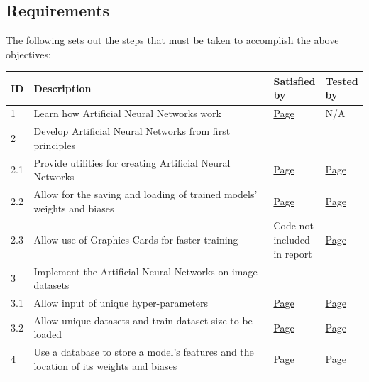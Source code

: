 \documentclass[./project-report/src/latex/project-report.tex]{subfiles}
\begin{document}
\subsection{Requirements}

The following sets out the steps that must be taken to accomplish the above objectives:

\noindent\begin{tabular}{|p{0.03\linewidth}|p{0.73\linewidth}|p{0.12\linewidth}|p{0.12\linewidth}|}
      \hline
      \textbf{ID} & \textbf{Description} & \textbf{Satisfied by} & \textbf{Tested by} \\
      \hline
      1 & Learn how Artificial Neural Networks work & \hyperref[sec:ann-theory]{Page \pageref{sec:ann-theory}} & N/A \\
      \hline
      2 & Develop Artificial Neural Networks from first principles & & \\
      \hline
      2.1 & Provide utilities for creating Artificial Neural Networks & \hyperref[sec:utils-subpackage]{Page \pageref{sec:utils-subpackage}} & \hyperref[sec:models-utils-unit-tests]{Page \pageref{sec:models-utils-unit-tests}} \\
      \hline
      2.2 & Allow for the saving and loading of trained models' weights and biases & \hyperref[sec:model-module]{Page \pageref{sec:model-module}} & \hyperref[sec:models-utils-unit-tests]{Page \pageref{sec:models-utils-unit-tests}} \\
      \hline
      2.3 & Allow use of Graphics Cards for faster training & Code not included in report & \hyperref[sec:cpu-vs-gpu-analysis]{Page \pageref{sec:cpu-vs-gpu-analysis}} \\
      \hline
      3 & Implement the Artificial Neural Networks on image datasets & & \\
      \hline
      3.1 & Allow input of unique hyper-parameters & \hyperref[sec:ann-implementations]{Page \pageref{sec:ann-implementations}} & \hyperref[sec:effects-of-hyper-parameters]{Page \pageref{sec:effects-of-hyper-parameters}} \\
      \hline
      3.2 & Allow unique datasets and train dataset size to be loaded & \hyperref[sec:ann-implementations]{Page \pageref{sec:ann-implementations}} & \hyperref[sec:train-dataset-size-analysis]{Page \pageref{sec:train-dataset-size-analysis}} \\
      \hline
      4 & Use a database to store a model's features and the location of its weights and biases & \hyperref[sec:__main__-module]{Page \pageref{sec:__main__-module}} & \hyperref[sec:database-unit-tests]{Page \pageref{sec:database-unit-tests}} \\

\end{tabular}
\end{document}
